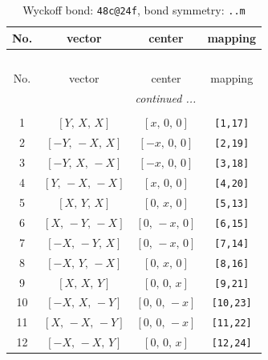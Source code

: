 \documentclass[fleqn,8pt]{jsarticle}
\begin{document}
\begin{longtable}{cccc}
\caption{Wyckoff bond: {\tt 48c@24f}, bond symmetry: {\tt ..m}}
 \\
 \hline \hline
No. & vector & center & mapping \\ \hline \endfirsthead

\multicolumn{3}{l}{\tablename\ \thetable{}} \\
 \hline \hline
No. & vector & center & mapping \\ \hline \endhead

 \hline \hline
\multicolumn{3}{r}{\footnotesize\it continued ...} \\ \endfoot

 \hline \hline
\multicolumn{3}{r}{} \\ \endlastfoot

1 & $\left[ Y,\, X,\, X \right]$ & $\left[ x,\, 0,\, 0 \right]$ & {\tt [1,17]} \\ \hline
2 & $\left[ - Y,\, - X,\, X \right]$ & $\left[ - x,\, 0,\, 0 \right]$ & {\tt [2,19]} \\ \hline
3 & $\left[ - Y,\, X,\, - X \right]$ & $\left[ - x,\, 0,\, 0 \right]$ & {\tt [3,18]} \\ \hline
4 & $\left[ Y,\, - X,\, - X \right]$ & $\left[ x,\, 0,\, 0 \right]$ & {\tt [4,20]} \\ \hline
5 & $\left[ X,\, Y,\, X \right]$ & $\left[ 0,\, x,\, 0 \right]$ & {\tt [5,13]} \\ \hline
6 & $\left[ X,\, - Y,\, - X \right]$ & $\left[ 0,\, - x,\, 0 \right]$ & {\tt [6,15]} \\ \hline
7 & $\left[ - X,\, - Y,\, X \right]$ & $\left[ 0,\, - x,\, 0 \right]$ & {\tt [7,14]} \\ \hline
8 & $\left[ - X,\, Y,\, - X \right]$ & $\left[ 0,\, x,\, 0 \right]$ & {\tt [8,16]} \\ \hline
9 & $\left[ X,\, X,\, Y \right]$ & $\left[ 0,\, 0,\, x \right]$ & {\tt [9,21]} \\ \hline
10 & $\left[ - X,\, X,\, - Y \right]$ & $\left[ 0,\, 0,\, - x \right]$ & {\tt [10,23]} \\ \hline
11 & $\left[ X,\, - X,\, - Y \right]$ & $\left[ 0,\, 0,\, - x \right]$ & {\tt [11,22]} \\ \hline
12 & $\left[ - X,\, - X,\, Y \right]$ & $\left[ 0,\, 0,\, x \right]$ & {\tt [12,24]} \\
\end{longtable}
\renewcommand{\arraystretch}{1.2}
\end{document}
